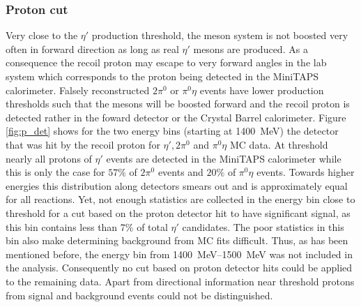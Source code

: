 \subsubsection{Proton cut}
Very close to the $\eta'$ production threshold, the meson system is not boosted very often in forward direction as long as real $\eta'$ mesons are produced. As a consequence the recoil proton may escape to very forward angles in the lab system which corresponds to the proton being detected in the MiniTAPS calorimeter. Falsely reconstructed $2\pi^0$ or $\pi^0\eta$ events have lower production thresholds such that the mesons will be boosted forward and the recoil proton is detected rather in the foward detector or the Crystal Barrel calorimeter. Figure \ref{fig:p_det} shows for the two energy bins (starting at \SI{1400}{\mega\eV}) the detector that was hit by the recoil proton for $\eta', 2\pi^0$ and $\pi^0\eta$ MC data. At threshold nearly all protons of $\eta'$ events are detected in the MiniTAPS calorimeter while this is only the case for $57\%$ of $2\pi^0$ events and $20\%$ of $\pi^0\eta$ events. Towards higher energies this distribution along detectors smears out and is approximately equal for all reactions. Yet, not enough statistics  are collected in the energy bin close to threshold for a cut based on the proton detector hit to have significant signal, as this bin contains less than 7\% of total $\eta'$ candidates. The poor statistics in this bin also make determining background from MC fits difficult. Thus, as has been mentioned before, the energy bin from \SIrange{1400}{1500}{\mega\eV} was not included in the analysis. Consequently no cut based on proton detector hits could be applied to the remaining data. Apart from directional information near threshold protons from signal and background events could not be distinguished.
